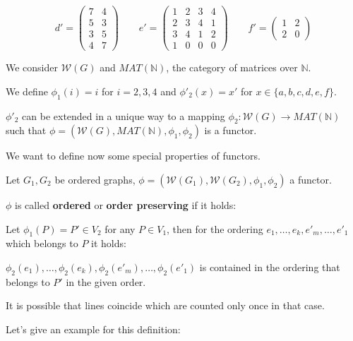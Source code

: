 \[
d' = \left( \begin{array}{cc}
7 & 4 \\ 5 & 3 \\ 3 & 5 \\ 4 & 7
\end{array} \right)
\qquad
e' = \left( \begin{array}{cccc}
1&2&3&4 \\ 2&3&4&1 \\ 3&4&1&2 \\ 1&0&0&0
\end{array} \right)
\qquad
f' = \left( \begin{array}{cc}
1&2 \\ 2&0
\end{array} \right)
\]

We consider $\mathcal{W}(G)$ and $MAT(\mathbb{N})$, the category of matrices
over $\mathbb{N}$.

We define $\phi_1(i) = i$ for $i = 2,3,4$ and $\phi'_2(x) = x'$ for $x \in \{
a, b, c, d, e, f \}$.

$\phi'_2$ can be extended in a unique way to a mapping $\phi_2 :
\mathcal{W}(G) \to MAT(\mathbb{N})$ such that $\phi = (\mathcal{W}(G),
MAT(\mathbb{N}), \phi_1, \phi_2)$ is a functor.

We want to define now some special properties of functors.

\begin{definition}
Let $G_1, G_2$ be ordered graphs, $\phi = (\mathcal{W}(G_1), \mathcal{W}(G_2),
\phi_1, \phi_2)$ a functor.

$\phi$ is called {\bf ordered} or {\bf order preserving} if it holds:

Let $\phi_1(P) = P' \in V_2$ for any $P \in V_1$, then for the ordering $e_1,
\ldots, e_k, e'_m, \ldots, e'_1$ which belongs to $P$ it holds:

$\phi_2(e_1), \ldots, \phi_2(e_k), \phi_2(e'_m), \ldots, \phi_2(e'_1)$ is
contained in the ordering that belongs to $P'$ in the given order. 
\end{definition}

It is possible that lines coincide which are counted only once in that case.

Let's give an example for this definition:







































